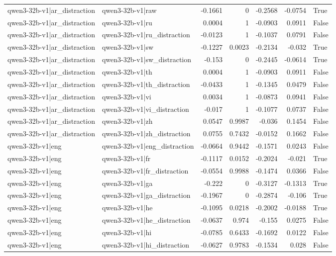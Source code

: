 \begin{table}
\begin{tabular}{l l r r r r l}
qwen3-32b-v1|ar_distraction & qwen3-32b-v1|raw & -0.1661 & 0 & -0.2568 & -0.0754 & True \\
qwen3-32b-v1|ar_distraction & qwen3-32b-v1|ru & 0.0004 & 1 & -0.0903 & 0.0911 & False \\
qwen3-32b-v1|ar_distraction & qwen3-32b-v1|ru_distraction & -0.0123 & 1 & -0.1037 & 0.0791 & False \\
qwen3-32b-v1|ar_distraction & qwen3-32b-v1|sw & -0.1227 & 0.0023 & -0.2134 & -0.032 & True \\
qwen3-32b-v1|ar_distraction & qwen3-32b-v1|sw_distraction & -0.153 & 0 & -0.2445 & -0.0614 & True \\
qwen3-32b-v1|ar_distraction & qwen3-32b-v1|th & 0.0004 & 1 & -0.0903 & 0.0911 & False \\
qwen3-32b-v1|ar_distraction & qwen3-32b-v1|th_distraction & -0.0433 & 1 & -0.1345 & 0.0479 & False \\
qwen3-32b-v1|ar_distraction & qwen3-32b-v1|vi & 0.0034 & 1 & -0.0873 & 0.0941 & False \\
qwen3-32b-v1|ar_distraction & qwen3-32b-v1|vi_distraction & -0.017 & 1 & -0.1077 & 0.0737 & False \\
qwen3-32b-v1|ar_distraction & qwen3-32b-v1|zh & 0.0547 & 0.9987 & -0.036 & 0.1454 & False \\
qwen3-32b-v1|ar_distraction & qwen3-32b-v1|zh_distraction & 0.0755 & 0.7432 & -0.0152 & 0.1662 & False \\
qwen3-32b-v1|eng & qwen3-32b-v1|eng_distraction & -0.0664 & 0.9442 & -0.1571 & 0.0243 & False \\
qwen3-32b-v1|eng & qwen3-32b-v1|fr & -0.1117 & 0.0152 & -0.2024 & -0.021 & True \\
qwen3-32b-v1|eng & qwen3-32b-v1|fr_distraction & -0.0554 & 0.9988 & -0.1474 & 0.0366 & False \\
qwen3-32b-v1|eng & qwen3-32b-v1|ga & -0.222 & 0 & -0.3127 & -0.1313 & True \\
qwen3-32b-v1|eng & qwen3-32b-v1|ga_distraction & -0.1967 & 0 & -0.2874 & -0.106 & True \\
qwen3-32b-v1|eng & qwen3-32b-v1|he & -0.1095 & 0.0218 & -0.2002 & -0.0188 & True \\
qwen3-32b-v1|eng & qwen3-32b-v1|he_distraction & -0.0637 & 0.974 & -0.155 & 0.0275 & False \\
qwen3-32b-v1|eng & qwen3-32b-v1|hi & -0.0785 & 0.6433 & -0.1692 & 0.0122 & False \\
qwen3-32b-v1|eng & qwen3-32b-v1|hi_distraction & -0.0627 & 0.9783 & -0.1534 & 0.028 & False \\

\end{tabular}
\end{table}

